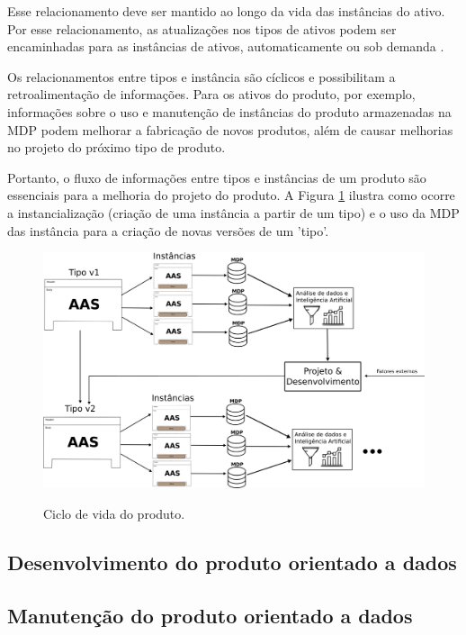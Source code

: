 \documentclass[
	12pt,				%
	oneside,			%
	a4paper,			%
	english,			%
	brazil				%
]{abntex2}
\begin{document}
	Esse relacionamento deve ser mantido ao longo da vida das instâncias do ativo. Por esse relacionamento, as atualizações nos tipos de ativos podem ser encaminhadas para as instâncias de ativos, automaticamente ou sob demanda \cite{bader2019aas}.
	
	Os relacionamentos entre tipos e instância são cíclicos e possibilitam a retroalimentação de informações. Para os ativos do produto, por exemplo, informações sobre o uso e manutenção de instâncias do produto armazenadas na MDP podem melhorar a fabricação de novos produtos, além de causar melhorias no projeto do próximo tipo de produto.
	
	Portanto, o fluxo de informações entre tipos e instâncias de um produto são essenciais para a melhoria do projeto do produto. A Figura \ref{fig:aas-lifecycle} ilustra como ocorre a instancialização (criação de uma instância a partir de um tipo) e o uso da MDP das instância para a criação de novas versões de um 'tipo'.
	
	\begin{figure}[H]
		\centering
		\caption{Ciclo de vida do produto.}
		\includegraphics[width=1\textwidth]{aas-lifecycle.png}
		\label{fig:aas-lifecycle}
	\end{figure}

	
	\subsection{Desenvolvimento do produto orientado a dados}

	\lipsum[1-1]
	
	\subsection{Manutenção do produto orientado a dados}
\end{document}
